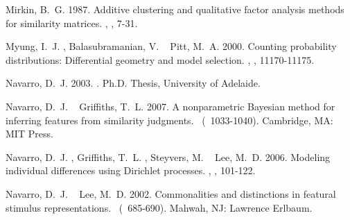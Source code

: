 \documentclass[11pt]{article}
\begin{document}
\begin{thebibliography}{}
%
%
Mirkin, B.~G.%
%
\newblock{}\BBOP{}1987\BBCP{}.
\newblock{}\BBOQ{}Additive clustering and qualitative factor analysis methods
  for similarity matrices.\BBCQ{}
\newblock{}, , 7-31.

%
%
Myung, I.~J.%
, Balasubramanian, V.%
\BCBL{}\ \BBA{} Pitt, M.~A.%
%
\newblock{}\BBOP{}2000\BBCP{}.
\newblock{}\BBOQ{}Counting probability distributions: Differential geometry and
  model selection.\BBCQ{}
\newblock{}, ,
  11170-11175.

%
%
Navarro, D.~J.%
%
\newblock{}\BBOP{}2003\BBCP{}.
\newblock{}.
\newblock{}Ph.D. Thesis, University of Adelaide.

%
%
Navarro, D.~J.%
\BCBT{}\ \BBA{} Griffiths, T.~L.%
%
\newblock{}\BBOP{}2007\BBCP{}.
\newblock{}\BBOQ{}A nonparametric Bayesian method for inferring features from
  similarity judgments.\BBCQ{}
\newblock{}\BIn{}  \ (\BPG\ 1033-1040).
\newblock{}Cambridge, MA: MIT Press.

%
%
Navarro, D.~J.%
, Griffiths, T.~L.%
, Steyvers, M.%
\BCBL{}\ \BBA{} Lee, M.~D.%
%
\newblock{}\BBOP{}2006\BBCP{}.
\newblock{}\BBOQ{}Modeling individual differences using {D}irichlet
  processes.\BBCQ{}
\newblock{}, , 101-122.

%
%
Navarro, D.~J.%
\BCBT{}\ \BBA{} Lee, M.~D.%
%
\newblock{}\BBOP{}2002\BBCP{}.
\newblock{}\BBOQ{}Commonalities and distinctions in featural stimulus
  representations.\BBCQ{}
\newblock{}\BIn{} \ (\BPG\ 685-690).
\newblock{}Mahwah, NJ: Lawrence Erlbaum.


\end{thebibliography}
\end{document}
